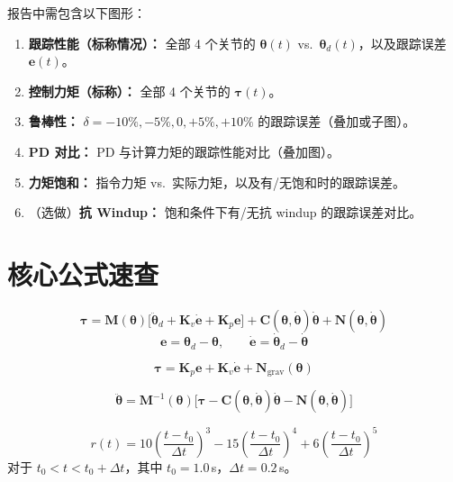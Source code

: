 \documentclass[12pt,a4paper]{ctexart}
\begin{document}
报告中需包含以下图形：

\begin{enumerate}[leftmargin=*]
  \item \textbf{跟踪性能（标称情况）：} 全部 4 个关节的 $\bm{\theta}(t)$ vs.\ $\bm{\theta}_d(t)$，以及跟踪误差 $\mathbf{e}(t)$。
  \item \textbf{控制力矩（标称）：} 全部 4 个关节的 $\bm{\tau}(t)$。
  \item \textbf{鲁棒性：} $\delta = -10\%, -5\%, 0, +5\%, +10\%$ 的跟踪误差（叠加或子图）。
  \item \textbf{PD 对比：} PD 与计算力矩的跟踪性能对比（叠加图）。
  \item \textbf{力矩饱和：} 指令力矩 vs.\ 实际力矩，以及有/无饱和时的跟踪误差。
  \item （选做）\textbf{抗 Windup：} 饱和条件下有/无抗 windup 的跟踪误差对比。
\end{enumerate}

\section{核心公式速查}

\begin{conceptbox}[计算力矩控制]
\[
\bm{\tau} = \mathbf{M}(\bm{\theta})\bigl[\ddot{\bm{\theta}}_d + \mathbf{K}_v\dot{\mathbf{e}} + \mathbf{K}_p\mathbf{e}\bigr] + \mathbf{C}(\bm{\theta},\dot{\bm{\theta}})\dot{\bm{\theta}} + \mathbf{N}(\bm{\theta},\dot{\bm{\theta}})
\]
\[
\mathbf{e} = \bm{\theta}_d - \bm{\theta},\qquad \dot{\mathbf{e}} = \dot{\bm{\theta}}_d - \dot{\bm{\theta}}
\]
\end{conceptbox}

\begin{conceptbox}[PD 控制 + 重力补偿]
\[
\bm{\tau} = \mathbf{K}_p\mathbf{e} + \mathbf{K}_v\dot{\mathbf{e}} + \mathbf{N}_{\text{grav}}(\bm{\theta})
\]
\end{conceptbox}

\begin{conceptbox}
\[
\ddot{\bm{\theta}} = \mathbf{M}^{-1}(\bm{\theta})\bigl[\bm{\tau} - \mathbf{C}(\bm{\theta},\dot{\bm{\theta}})\dot{\bm{\theta}} - \mathbf{N}(\bm{\theta},\dot{\bm{\theta}})\bigr]
\]
\end{conceptbox}

\begin{conceptbox}[五次圆角阶跃]
\[
r(t) = 10\left(\frac{t-t_0}{\Delta t}\right)^3 - 15\left(\frac{t-t_0}{\Delta t}\right)^4 + 6\left(\frac{t-t_0}{\Delta t}\right)^5
\]
对于 $t_0 < t < t_0+\Delta t$，其中 $t_0=1.0$\,s，$\Delta t=0.2$\,s。
\end{conceptbox}
\end{document}
